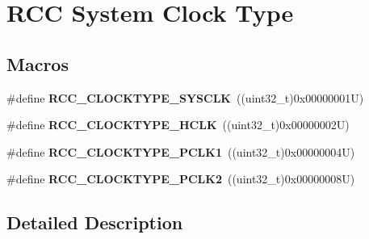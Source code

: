 \hypertarget{group___r_c_c___system___clock___type}{}\section{R\+CC System Clock Type}
\label{group___r_c_c___system___clock___type}
\subsection*{Macros}
\begin{DoxyCompactItemize}
\item 
\mbox{\label{group___r_c_c___system___clock___type_ga7e721f5bf3fe925f78dae0356165332e}} 
\#define {\bfseries R\+C\+C\+\_\+\+C\+L\+O\+C\+K\+T\+Y\+P\+E\+\_\+\+S\+Y\+S\+C\+LK}~((uint32\+\_\+t)0x00000001\+U)
\item 
\mbox{\label{group___r_c_c___system___clock___type_gaa5330efbd790632856a2b15851517ef9}} 
\#define {\bfseries R\+C\+C\+\_\+\+C\+L\+O\+C\+K\+T\+Y\+P\+E\+\_\+\+H\+C\+LK}~((uint32\+\_\+t)0x00000002\+U)
\item 
\mbox{\label{group___r_c_c___system___clock___type_gab00c7b70f0770a616be4b5df45a454c4}} 
\#define {\bfseries R\+C\+C\+\_\+\+C\+L\+O\+C\+K\+T\+Y\+P\+E\+\_\+\+P\+C\+L\+K1}~((uint32\+\_\+t)0x00000004\+U)
\item 
\mbox{\label{group___r_c_c___system___clock___type_gaef7e78706e597a6551d71f5f9ad60cc0}} 
\#define {\bfseries R\+C\+C\+\_\+\+C\+L\+O\+C\+K\+T\+Y\+P\+E\+\_\+\+P\+C\+L\+K2}~((uint32\+\_\+t)0x00000008\+U)
\end{DoxyCompactItemize}


\subsection{Detailed Description}
